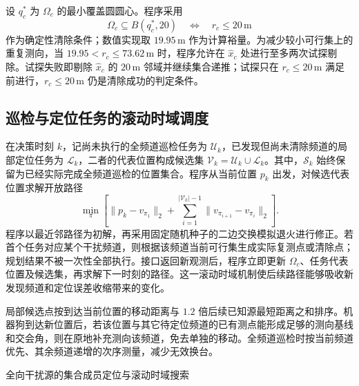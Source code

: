 设 $q_c^*$ 为 $\Omega_c$ 的最小覆盖圆圆心。程序采用
\begin{equation}
  \Omega_c\subseteq B(q_c^*,20)
  \quad\Longleftrightarrow\quad r_c\le20\,\mathrm m
  \label{eq:p3-clear}
\end{equation}
作为确定性清除条件；数值实现取 $19.95\,\mathrm m$ 作为计算裕量。为减少较小可行集上的重复测向，当
$19.95<r_c\le73.62\,\mathrm m$ 时，程序允许在 $\hat x_c$ 处进行至多两次试探剔除。试探失败即剔除 $\hat x_c$ 的 $20\,\mathrm m$ 邻域并继续集合递推；试探只在 $r_c\le20\,\mathrm m$ 满足前进行，$r_c\le20\,\mathrm m$ 仍是清除成功的判定条件。

\subsection{巡检与定位任务的滚动时域调度}

在决策时刻 $k$，记尚未执行的全频道巡检任务为 $\mathcal U_k$，已发现但尚未清除频道的局部定位任务为 $\mathcal L_k$，二者的代表位置构成候选集
$\mathcal V_k=\mathcal U_k\cup\mathcal L_k$。其中，$\mathcal S_k$ 始终保留为已经实际完成全频道巡检的位置集合。程序从当前位置 $p_k$ 出发，对候选代表位置求解开放路径
\begin{equation}
  \min_{\pi}\left[\|p_k-v_{\pi_1}\|_2+
  \sum_{i=1}^{|\mathcal V_k|-1}\|v_{\pi_{i+1}}-v_{\pi_i}\|_2\right].
  \label{eq:p3-route}
\end{equation}
程序以最近邻路径为初解，再采用固定随机种子的二边交换模拟退火\cite{kirkpatrick1983annealing}进行修正。若首个任务对应某个干扰频道，则根据该频道当前可行集生成实际复测点或清除点；规划结果不被一次性全部执行。接口返回新观测后，程序立即更新 $\Omega_c$、任务代表位置及候选集，再求解下一时刻的路径。这一滚动时域机制\cite{mayne2000mpc}使后续路径能够吸收新发现频道和定位误差收缩带来的变化。

局部候选点按到达当前位置的移动距离与 $1.2$ 倍后续已知源最短距离之和排序。机器狗到达新位置后，若该位置与其它待定位频道的已有测点能形成足够的测向基线和交会角，则在原地补充测向该频道，免去单独的移动。全频道巡检时按当前频道优先、其余频道递增的次序测量，减少无效换台。

\begin{modelalgorithm}{全向干扰源的集合成员定位与滚动时域搜索}
  \label{alg:p3}
  \begin{enumerate}[leftmargin=2.5em]
  \end{enumerate}
\end{modelalgorithm}

